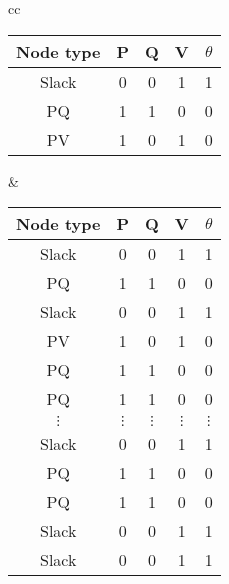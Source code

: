 \begin{tabular}{cc}%
    \begin{tabular}{|c|c|c|c|c|}%
        \hline%
        Node type & P & Q & V & $\theta$ \\%
        \hline%
        Slack     & 0 & 0 & 1 & 1        \\%
        \hline%
        PQ        & 1 & 1 & 0 & 0        \\%
        \hline%
        PV        & 1 & 0 & 1 & 0        \\%
        \hline%
    \end{tabular} & \begin{tabular}{|c|c|c|c|c|}%
                        \hline%
                        Node type & P        & Q        & V        & $\theta$ \\%
                        \hline%
                        Slack     & 0        & 0        & 1        & 1        \\%
                        \hline%
                        PQ        & 1        & 1        & 0        & 0        \\%
                        \hline%
                        Slack     & 0        & 0        & 1        & 1        \\%
                        \hline%
                        PV        & 1        & 0        & 1        & 0        \\%
                        \hline%
                        PQ        & 1        & 1        & 0        & 0        \\%
                        \hline%
                        PQ        & 1        & 1        & 0        & 0        \\%
                        \hline%
                        $\vdots$  & $\vdots$ & $\vdots$ & $\vdots$ & $\vdots$ \\%
                        \hline%
                        Slack     & 0        & 0        & 1        & 1        \\%
                        \hline%
                        PQ        & 1        & 1        & 0        & 0        \\%
                        \hline%
                        PQ        & 1        & 1        & 0        & 0        \\%
                        \hline%
                        Slack     & 0        & 0        & 1        & 1        \\%
                        \hline%
                        Slack     & 0        & 0        & 1        & 1        \\%
                        \hline%
    \end{tabular} \\%
\end{tabular}